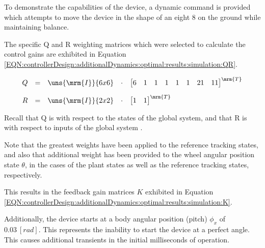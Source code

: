 \documentclass[crop=false,float=true,class=scrreprt]{standalone}
\begin{document}
\clearpage




\label{SEC:controllerDesign:additionalDynamics:optimal:results:simulation}

To demonstrate the capabilities of the device,
a dynamic command is provided which attempts to move the device
in the shape of an eight $8$ on the ground
while maintaining balance.

The specific Q and R weighting matrices which were selected to calculate the control gains
are exhibited in Equation~%
\eqref{EQN:controllerDesign:additionalDynamics:optimal:results:simulation:QR}.

\vspace{-0em}
\begin{equation}
\label{EQN:controllerDesign:additionalDynamics:optimal:results:simulation:QR}
\begin{array}{ccccl}
Q
& = &
\displaystyle\uns{\mrm{I}}{6 x 6}
& \cdot &
\begin{bmatrix}
6 & 1 & 1 & 1 & 1 & 1 & 21 & 11
\end{bmatrix}^{\mrm{T}}
\\[+1em]
R
& = &
\displaystyle\uns{\mrm{I}}{2 x 2}
& \cdot &
\begin{bmatrix}
1 & 1
\end{bmatrix}^{\mrm{T}}
\end{array}
\end{equation}
\vspace{-0.5em}

Recall that Q is with respect to the states of the global system,
{}
and 
that R is with respect to inputs of the global system
{}.

Note that the greatest weights have been applied to the reference tracking states,
and also that additional weight has been provided to the wheel angular position state $\theta$,
in the cases of the plant states as well as the reference tracking states, respectively.

This results in the feedback gain matrices $K$ exhibited in Equation~%
\eqref{EQN:controllerDesign:additionalDynamics:optimal:results:simulation:K}.


Additionally, the device starts at a body angular position (pitch) $\phi_x$ of $0.03\ [rad]$.
This represents the inability to start the device at a perfect angle.
This causes additional transients in the initial milliseconds of operation.
\end{document}
